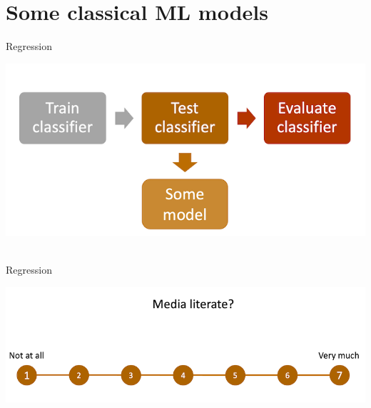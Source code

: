 \documentclass[handout]{beamer}
\begin{document}
\section{Some classical ML models}

\begin{frame}{Regression}
	
	\begin{center}
		\includegraphics[width=\linewidth,height=\textheight,keepaspectratio]{../pictures/MLprocess_model.png} \\\
	\end{center}
	
	
	
\end{frame}


\begin{frame}{Regression}
	
	\begin{center}
		\includegraphics[width=\linewidth,height=\textheight,keepaspectratio]{../pictures/medialiteracyscale.png} \\\
	\end{center}
	
	
	
	
	
	
\end{frame}
\end{document}
